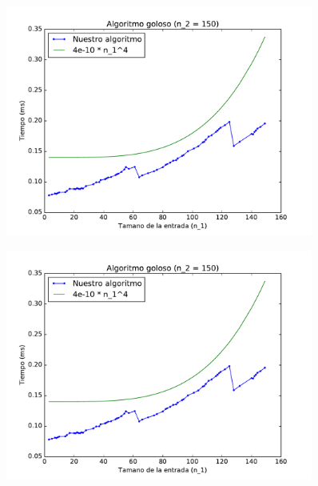 \begin{figure}[H]
 \centering
	\includegraphics[width=0.9\textwidth]{graficos/problema_4/tiempos_3.pdf}
	\caption{}
	\label{fig:problema4-3}
\end{figure}


\begin{figure}[H]
 \centering
	\includegraphics[width=0.9\textwidth]{graficos/problema_4/calidad.pdf}
	\caption{}
	\label{fig:problema4-4}
\end{figure}
